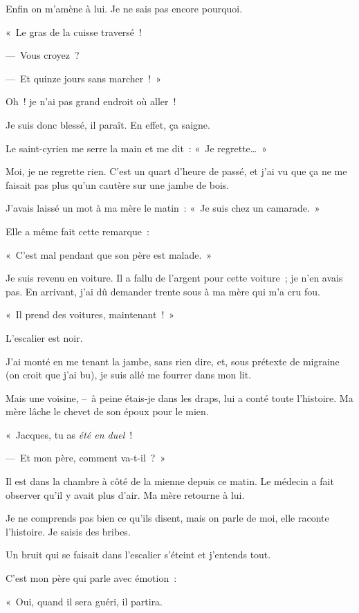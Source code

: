 \documentclass[french,twoside]{book} %
\begin{document}
Enfin on m’amène à lui. Je ne sais pas encore pourquoi.\par
« Le gras de la cuisse traversé !\par
— Vous croyez ?\par
— Et quinze jours sans marcher ! »\par
Oh ! je n’ai pas grand endroit où aller !\par
Je suis donc blessé, il paraît. En effet, ça saigne.\par
Le saint-cyrien me serre la main et me dit : « Je regrette… »\par
Moi, je ne regrette rien. C’est un quart d’heure de passé, et j’ai vu que ça ne me faisait pas plus qu’un cautère sur une jambe de bois.\par
J’avais laissé un mot à ma mère le matin : « Je suis chez un camarade. »\par
Elle a même fait cette remarque :\par
« C’est mal pendant que son père est malade. »\par
\bigbreak
\noindent Je suis revenu en voiture. Il a fallu de l’argent pour cette voiture ; je n’en avais pas. En arrivant, j’ai dû demander trente sous à ma mère qui m’a cru fou.\par
« Il prend des voitures, maintenant ! »\par
L’escalier est noir.\par
J’ai monté en me tenant la jambe, sans rien dire, et, sous prétexte de migraine (on croit que j’ai bu), je suis allé me fourrer dans mon lit.\par
Mais une voisine, – à peine étais-je dans les draps, lui a conté toute l’histoire. Ma mère lâche le chevet de son époux pour le mien.\par
« Jacques, tu as \emph{été en duel} !\par
— Et mon père, comment va-t-il ? »\par
\bigbreak
\noindent Il est dans la chambre à côté de la mienne depuis ce matin. Le médecin a fait observer qu’il y avait plus d’air. Ma mère retourne à lui.\par
Je ne comprends pas bien ce qu’ils disent, mais on parle de moi, elle raconte l’histoire. Je saisis des bribes.\par
Un bruit qui se faisait dans l’escalier s’éteint et j’entends tout.\par
C’est mon père qui parle avec émotion :\par
« Oui, quand il sera guéri, il partira.\par
\end{document}
